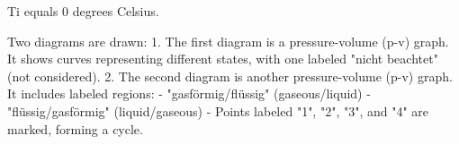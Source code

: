 Ti equals 0 degrees Celsius.  

Two diagrams are drawn:  
1. The first diagram is a pressure-volume (p-v) graph. It shows curves representing different states, with one labeled "nicht beachtet" (not considered).  
2. The second diagram is another pressure-volume (p-v) graph. It includes labeled regions:  
   - "gasförmig/flüssig" (gaseous/liquid)  
   - "flüssig/gasförmig" (liquid/gaseous)  
   - Points labeled "1", "2", "3", and "4" are marked, forming a cycle.